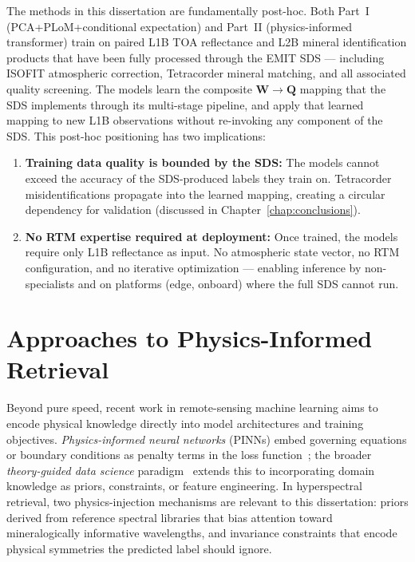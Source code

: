 \documentclass[11pt]{report}
\begin{document}
The methods in this dissertation are fundamentally post-hoc. Both Part~I (PCA+PLoM+conditional expectation) and Part~II (physics-informed transformer) train on paired L1B TOA reflectance and L2B mineral identification products that have been fully processed through the EMIT SDS --- including ISOFIT atmospheric correction, Tetracorder mineral matching, and all associated quality screening. The models learn the composite $\mathbf{W} \rightarrow \mathbf{Q}$ mapping that the SDS implements through its multi-stage pipeline, and apply that learned mapping to new L1B observations without re-invoking any component of the SDS. This post-hoc positioning has two implications:
\begin{enumerate}
  \item \textbf{Training data quality is bounded by the SDS:} The models cannot exceed the accuracy of the SDS-produced labels they train on. Tetracorder misidentifications propagate into the learned mapping, creating a circular dependency for validation (discussed in Chapter~\ref{chap:conclusions}).
  \item \textbf{No RTM expertise required at deployment:} Once trained, the models require only L1B reflectance as input. No atmospheric state vector, no RTM configuration, and no iterative optimization --- enabling inference by non-specialists and on platforms (edge, onboard) where the full SDS cannot run.
\end{enumerate}

\section{Approaches to Physics-Informed Retrieval}
\label{sec:physics_informed_approaches}

Beyond pure speed, recent work in remote-sensing machine learning aims to encode physical knowledge directly into model architectures and training objectives. \emph{Physics-informed neural networks} (PINNs) embed governing equations or boundary conditions as penalty terms in the loss function~\cite{raissi2019pinn}; the broader \emph{theory-guided data science} paradigm~\cite{karpatne2017tgds} extends this to incorporating domain knowledge as priors, constraints, or feature engineering. In hyperspectral retrieval, two physics-injection mechanisms are relevant to this dissertation: priors derived from reference spectral libraries that bias attention toward mineralogically informative wavelengths, and invariance constraints that encode physical symmetries the predicted label should ignore.
\end{document}
